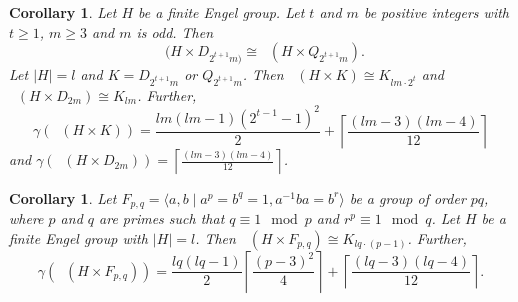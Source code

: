 \documentclass[reqno,12pt]{amsart}
\theoremstyle{plain}
\newtheorem{cor}[thm]{Corollary}
\theoremstyle{definition}
\newcommand{\coeng}{\mathop{\mathcal{E}_c^-}}
\begin{document}
\begin{cor} \label{dihede}
Let $H$ be a finite Engel group. Let $t$ and $m$ be positive integers with $t\geq 1$, $m\geq 3$ and $m$ is odd. Then 
$$
\coeng(H\times D_{2^{t+1}m)} \cong \coeng( H\times Q_{2^{t+1}m}).
$$	
Let $|H| = l$ and $K=D_{2^{t+1}m}$ or $Q_{2^{t+1}m}$. Then $\coeng(H\times K) \cong K_{lm \cdot 2^t}$ and  $\coeng(H\times D_{2m}) \cong K_{lm}$. 
Further,
\[
\gamma(\coeng(H\times K))
= \frac{lm(lm - 1)(2^{t-1}-1)^2}{2} + \left\lceil \frac{(lm-3)(lm-4)}{12}\right
\rceil
\]
and $\gamma(\coeng(H\times D_{2m})) = \left\lceil \frac{(lm-3)(lm-4)}{12}\right\rceil$.
\end{cor}
%




\begin{cor} \label{pqcor} 
Let $F_{p, q} =\langle a,b \mid a^p=b^q=1, a^{-1}ba=b^r\rangle$ be a group of order $pq$, where $p$ and $q$ are primes such that $q\equiv 1 \mod p$ and $r^p\equiv 1 \mod q$. Let $H$ be a finite Engel group with $|H|=l$. Then $\coeng(H\times F_{p, q}) \cong K_{lq \cdot (p-1)}$.
Further, 
\[
\gamma(\coeng(H\times F_{p, q})) =  \frac{lq(lq - 1)}{2}\left\lceil\frac{(p-3)^2}{4}\right
\rceil + \left\lceil \frac{(lq-3)(lq-4)}{12}\right
\rceil. 
\]
\end{cor}
%
\end{document}
